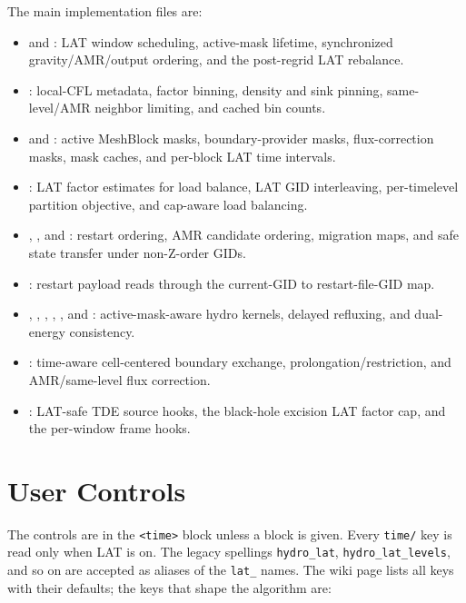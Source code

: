 \documentclass[11pt]{article}
\begin{document}
The main implementation files are:
\begin{itemize}
  \item {} and : LAT
        window scheduling, active-mask lifetime, synchronized gravity/AMR/output
        ordering, and the post-regrid LAT rebalance.
  \item {}: local-CFL metadata, factor binning,
        density and sink pinning, same-level/AMR neighbor limiting, and cached
        bin counts.
  \item {} and
        : active MeshBlock masks,
        boundary-provider masks, flux-correction masks, mask caches, and
        per-block LAT time intervals.
  \item {}: LAT factor estimates for load
        balance, LAT GID interleaving, per-timelevel partition objective, and
        cap-aware load balancing.
  \item {},
        , and
        : restart ordering, AMR
        candidate ordering, migration maps, and safe state transfer under
        non-Z-order GIDs.
  \item {}: restart payload reads through the
        current-GID to restart-file-GID map.
  \item {},
        ,
        ,
        ,
        , and
        : active-mask-aware hydro
        kernels, delayed refluxing, and dual-energy consistency.
  \item {}: time-aware cell-centered boundary exchange,
        prolongation/restriction, and AMR/same-level flux correction.
  \item {}: LAT-safe TDE source hooks, the
        black-hole excision LAT factor cap, and the per-window frame hooks.
\end{itemize}

\section{User Controls}

The controls are in the \texttt{<time>} block unless a block is given.  Every
\texttt{time/} key is read only when LAT is on.  The legacy spellings
\texttt{hydro\_lat}, \texttt{hydro\_lat\_levels}, and so on are accepted as
aliases of the \texttt{lat\_} names.  The wiki page lists all keys with their
defaults; the keys that shape the algorithm are:
\end{document}
